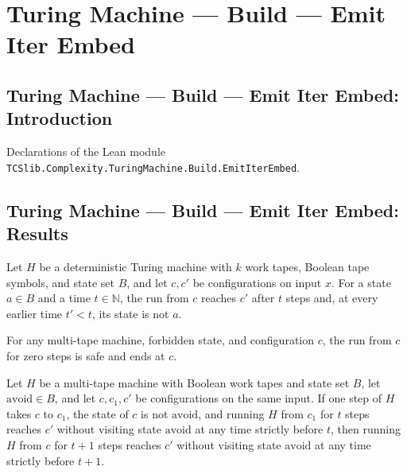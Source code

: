 \section{Turing Machine --- Build --- Emit Iter Embed}
\subsection*{Turing Machine --- Build --- Emit Iter Embed: Introduction}

Declarations of the Lean module \texttt{TCSlib.Complexity.TuringMachine.Build.EmitIterEmbed}.

\subsection*{Turing Machine --- Build --- Emit Iter Embed: Results}

\begin{definition}
\label{Turing.SafeRun}
\leanok
{}
Let $H$ be a deterministic Turing machine with $k$ work tapes, Boolean tape symbols, and
state set $B$, and let $c,c'$ be configurations on input $x$. For a state $a\in B$ and a
time $t\in\mathbb N$, the run from $c$ reaches $c'$ after $t$ steps and, at every
earlier time $t'<t$, its state is not $a$.
\end{definition}

\begin{theorem}
\label{Turing.SafeRun.zero}
\leanok
{}
For any multi-tape machine, forbidden state, and configuration $c$, the run from $c$ for
zero steps is safe and ends at $c$.
\end{theorem}

\begin{theorem}
\label{Turing.SafeRun.cons}
\leanok
{}
Let $H$ be a multi-tape machine with Boolean work tapes and state set $B$, let
$\mathrm{avoid}\in B$, and let $c,c_1,c'$ be configurations on the same input. If one
step of $H$ takes $c$ to $c_1$, the state of $c$ is not $\mathrm{avoid}$, and running
$H$ from $c_1$ for $t$ steps reaches $c'$ without visiting state $\mathrm{avoid}$ at any
time strictly before $t$, then running $H$ from $c$ for $t+1$ steps reaches $c'$ without
visiting state $\mathrm{avoid}$ at any time strictly before $t+1$.
\end{theorem}

